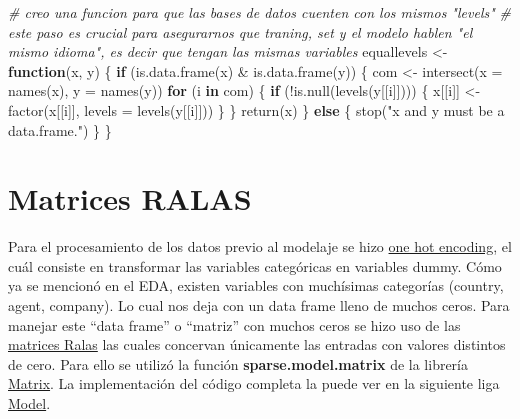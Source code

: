 \documentclass[
]{book}
\newenvironment{Shaded}{\begin{snugshade}}{\end{snugshade}}
\newcommand{\AttributeTok}[1]{\textcolor[rgb]{0.77,0.63,0.00}{#1}}
\newcommand{\CommentTok}[1]{\textcolor[rgb]{0.56,0.35,0.01}{\textit{#1}}}
\newcommand{\ControlFlowTok}[1]{\textcolor[rgb]{0.13,0.29,0.53}{\textbf{#1}}}
\newcommand{\FunctionTok}[1]{\textcolor[rgb]{0.00,0.00,0.00}{#1}}
\newcommand{\NormalTok}[1]{#1}
\newcommand{\OtherTok}[1]{\textcolor[rgb]{0.56,0.35,0.01}{#1}}
\newcommand{\SpecialCharTok}[1]{\textcolor[rgb]{0.00,0.00,0.00}{#1}}
\newcommand{\StringTok}[1]{\textcolor[rgb]{0.31,0.60,0.02}{#1}}
\begin{document}
\begin{Shaded}
\begin{Highlighting}[]
\CommentTok{\# creo una funcion para que las bases de datos cuenten con los mismos "levels"}
\CommentTok{\# este paso es crucial para asegurarnos que traning, set y el modelo hablen "el mismo idioma", es decir que tengan las mismas variables}
\NormalTok{equallevels }\OtherTok{\textless{}{-}} \ControlFlowTok{function}\NormalTok{(x, y) \{}
    \ControlFlowTok{if}\NormalTok{ (}\FunctionTok{is.data.frame}\NormalTok{(x) }\SpecialCharTok{\&} \FunctionTok{is.data.frame}\NormalTok{(y)) \{}
\NormalTok{        com }\OtherTok{\textless{}{-}} \FunctionTok{intersect}\NormalTok{(}\AttributeTok{x =} \FunctionTok{names}\NormalTok{(x), }\AttributeTok{y =} \FunctionTok{names}\NormalTok{(y))}
        \ControlFlowTok{for}\NormalTok{ (i }\ControlFlowTok{in}\NormalTok{ com) \{}
            \ControlFlowTok{if}\NormalTok{ (}\SpecialCharTok{!}\FunctionTok{is.null}\NormalTok{(}\FunctionTok{levels}\NormalTok{(y[[i]]))) \{}
\NormalTok{                x[[i]] }\OtherTok{\textless{}{-}} \FunctionTok{factor}\NormalTok{(x[[i]], }\AttributeTok{levels =} \FunctionTok{levels}\NormalTok{(y[[i]]))}
\NormalTok{            \}}
\NormalTok{        \}}
        \FunctionTok{return}\NormalTok{(x)}
\NormalTok{    \} }\ControlFlowTok{else}\NormalTok{ \{}
        \FunctionTok{stop}\NormalTok{(}\StringTok{"\textasciigrave{}x\textasciigrave{} and \textasciigrave{}y\textasciigrave{} must be a data.frame."}\NormalTok{)}
\NormalTok{    \}}
\NormalTok{\}}
\end{Highlighting}
\end{Shaded}

\hypertarget{matrices-ralas}{%
\section{Matrices RALAS}\label{matrices-ralas}}

Para el procesamiento de los datos previo al modelaje se hizo \href{https://www.educative.io/blog/one-hot-encoding}{one hot encoding}, el cuál consiste en transformar las variables categóricas en variables dummy. Cómo ya se mencionó en el EDA, existen variables con muchísimas categorías (country, agent, company). Lo cual nos deja con un data frame lleno de muchos ceros. Para manejar este ``data frame'' o ``matriz'' con muchos ceros se hizo uso de las \href{http://amunategui.github.io/sparse-matrix-glmnet/}{matrices Ralas} las cuales concervan únicamente las entradas con valores distintos de cero. Para ello se utilizó la función \textbf{sparse.model.matrix} de la librería \href{https://cran.rproject.org/web/packages/Matrix/index.html}{Matrix}. La implementación del código completa la puede ver en la siguiente liga \href{https://github.com/marcoyel21/hotel_cancelation_ML21/blob/main/final/modelo_final\%20.Rmd}{Model}.
\end{document}
